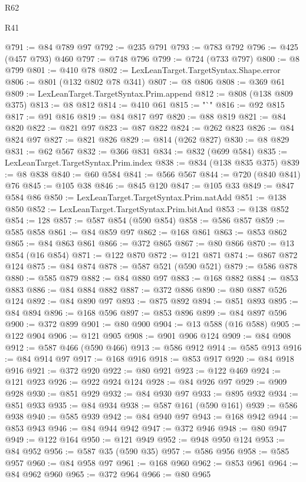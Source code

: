 \begin{lexlean}{R62}
\begin{lexlean}{R41}
\begin{coremodule}
{{{{{{{{{{{{{{{{{{{{{{{{{{{{{{{{{{{{{{{{{{{{{{{{{{{{{{{{{{{{{{{{{{{{{{{{{{{{{{{{{{{{{{{@791 := @84 @789 @97
@792 := @235 @791
@793 := @783 @792
@796 := @425 (@457 @793) @460
@797 := @748 @796
@799 := @724 (@733 @797)
@800 := @8 @799
@801 := @410 @78
@802 := LexLeanTarget.TargetSyntax.Shape.error
@806 := @801 (@132 @802 @78 @341)
@807 := @8 @806
@808 := @369 @61
@809 := LexLeanTarget.TargetSyntax.Prim.append
@812 := @808 (@138 @809 @375)
@813 := @8 @812
@814 := @410 @61
@815 := "`"
@816 := @92 @815
@817 := @91 @816
@819 := @84 @817 @97
@820 := @88 @819
@821 := @84 @820
@822 := @821 @97
@823 := @87 @822
@824 := @262 @823
@826 := @84 @824 @97
@827 := @821 @826
@829 := @814 (@262 @827)
@830 := @8 @829
@831 := @62 @567
@832 := @366 @831
@834 := @832 (@699 @584)
@835 := LexLeanTarget.TargetSyntax.Prim.index
@838 := @834 (@138 @835 @375)
@839 := @8 @838
@840 := @60 @584
@841 := @566 @567
@844 := @720 (@840 @841) @76
@845 := @105 @38
@846 := @845 @120
@847 := @105 @33
@849 := @847 @584 @86
@850 := LexLeanTarget.TargetSyntax.Prim.natAdd
@851 := @138 @850
@852 := LexLeanTarget.TargetSyntax.Prim.bitAnd
@853 := @138 @852
@854 := 128
@857 := @587 @854 (@590 @854)
@858 := @586 @857
@859 := @585 @858
@861 := @84 @859 @97
@862 := @168 @861
@863 := @853 @862
@865 := @84 @863 @861
@866 := @372 @865
@867 := @80 @866
@870 := @13 @854 (@16 @854)
@871 := @122 @870
@872 := @121 @871
@874 := @867 @872 @124
@875 := @84 @874
@878 := @587 @521 (@590 @521)
@879 := @586 @878
@880 := @585 @879
@882 := @84 @880 @97
@883 := @168 @882
@884 := @853 @883
@886 := @84 @884 @882
@887 := @372 @886
@890 := @80 @887 @526 @124
@892 := @84 @890 @97
@893 := @875 @892
@894 := @851 @893
@895 := @84 @894
@896 := @168 @596
@897 := @853 @896
@899 := @84 @897 @596
@900 := @372 @899
@901 := @80 @900
@904 := @13 @588 (@16 @588)
@905 := @122 @904
@906 := @121 @905
@908 := @901 @906 @124
@909 := @84 @908
@912 := @587 @466 (@590 @466)
@913 := @586 @912
@914 := @585 @913
@916 := @84 @914 @97
@917 := @168 @916
@918 := @853 @917
@920 := @84 @918 @916
@921 := @372 @920
@922 := @80 @921
@923 := @122 @469
@924 := @121 @923
@926 := @922 @924 @124
@928 := @84 @926 @97
@929 := @909 @928
@930 := @851 @929
@932 := @84 @930 @97
@933 := @895 @932
@934 := @851 @933
@935 := @84 @934
@938 := @587 @161 (@590 @161)
@939 := @586 @938
@940 := @585 @939
@942 := @84 @940 @97
@943 := @168 @942
@944 := @853 @943
@946 := @84 @944 @942
@947 := @372 @946
@948 := @80 @947
@949 := @122 @164
@950 := @121 @949
@952 := @948 @950 @124
@953 := @84 @952
@956 := @587 @35 (@590 @35)
@957 := @586 @956
@958 := @585 @957
@960 := @84 @958 @97
@961 := @168 @960
@962 := @853 @961
@964 := @84 @962 @960
@965 := @372 @964
@966 := @80 @965
}}}}}}}}}}}}}}}}}}}}}}}}}}}}}}}}}}}}}}}}}}}}}}}}}}}}}}}}}}}}}}}}}}}}}}}}}}}}}}}}}}}}}}}
\end{coremodule}
\end{lexlean}
\end{lexlean}
